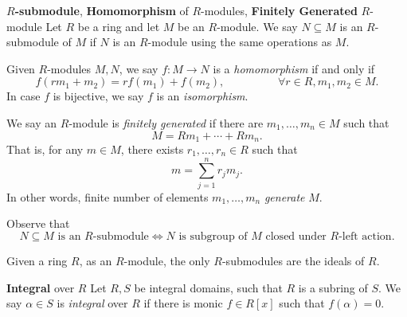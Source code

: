 \documentclass[pmath441]{subfiles}
\begin{document}
    \rruleline
    
    \begin{definition}{\textbf{$R$-submodule}, \textbf{Homomorphism} of $R$-modules, \textbf{Finitely Generated} $R$-module}
        Let $R$ be a ring and let $M$ be an $R$-module. We say $N\subseteq M$ is an $R$-submodule of $M$ if $N$ is an $R$-module using the same operations as $M$.

        Given $R$-modules $M,N$, we say $f:M\to N$ is a \emph{homomorphism} if and only if
        \begin{equation*}
            f\left( rm_1+m_2 \right) = rf\left( m_1 \right) + f\left( m_2 \right), \hspace{2cm}\forall r\in R, m_1,m_2\in M.
        \end{equation*}
        In case $f$ is bijective, we say $f$ is an \emph{isomorphism}.

        We say an $R$-module is \emph{finitely generated} if there are $m_1,\ldots,m_n\in M$ such that
        \begin{equation*}
            M = Rm_1 + \cdots + Rm_n.
        \end{equation*}
        That is, for any $m\in M$, there exists $r_1,\ldots,r_n\in R$ such that
        \begin{equation*}
            m = \sum^{n}_{j=1}r_jm_j.
        \end{equation*}
        In other words, finite number of elements $m_1,\ldots,m_n$ \emph{generate} $M$.
    \end{definition}

    \np Observe that
    \begin{equation*}
        \text{$N\subseteq M$ is an $R$-submodule} \iff \text{$N$ is subgroup of $M$ closed under $R$-left action}.
    \end{equation*}
    
    \begin{example}{}
        Given a ring $R$, as an $R$-module, the only $R$-submodules are the ideals of $R$.
    \end{example}

    \rruleline

    \begin{definition}{\textbf{Integral} over $R$}
        Let $R,S$ be integral domains, such that $R$ is a subring of $S$. We say $\alpha\in S$ is \emph{integral} over $R$ if there is monic $f\in R\left[ x \right]$ such that $f\left( \alpha \right) = 0$.
    \end{definition}
\end{document}
